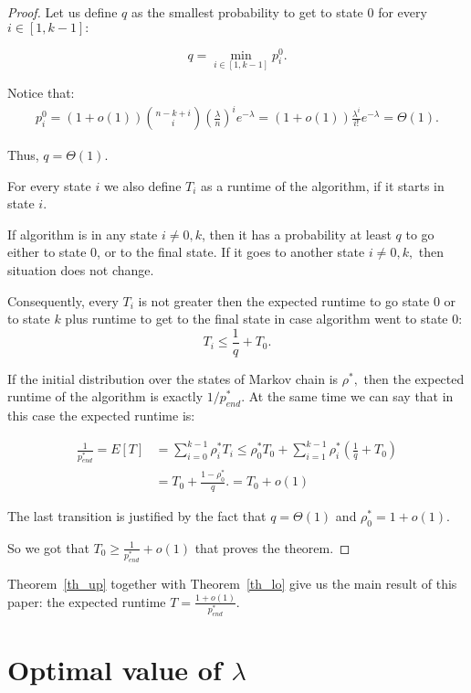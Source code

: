 \documentclass{article}
\begin{document}
\begin{proof}
Let us define $q$ as the smallest probability to get to state $0$ for every $i \in [1, k - 1]:$

$$q = \min\limits_{i \in [1, k - 1]} p_i^0.$$

Notice that:
\begin{align*}
p_i^0 = (1 + o(1))\binom{n - k + i}{i}\left(\frac{\lambda}{n}\right)^i e^{-\lambda}= (1 + o(1))\frac{\lambda^i}{i!}e^{-\lambda} = \Theta(1).
\end{align*}

Thus, $q = \Theta(1).$

For every state $i$ we also define $T_i$ as a runtime of the algorithm, if it starts in state $i$.

If algorithm is in any state $i \ne 0, k$, then it has a probability at least $q$ to go either to state $0$, or to the final state. If it goes to another state $i \ne 0, k,$ then situation does not change.

Consequently, every $T_i$ is not greater then the expected runtime to go state $0$ or to state $k$ plus runtime to get to the final state in case algorithm went to state $0:$
$$T_i \le \frac{1}{q} + T_0.$$

If the initial distribution over the states of Markov chain is $\rho^*,$ then the expected runtime of the algorithm is exactly $1/p_{end}^*.$ At the same time we can say that in this case the expected runtime is:

\begin{align*}
  \frac{1}{p_{end}^*} = E[T] &= \sum\limits_{i = 0}^{k - 1} \rho_i^* T_i \le \rho_0^* T_0 + \sum\limits_{i = 1}^{k - 1}\rho_i^*(\frac{1}{q} + T_0) \\
  &= T_0 + \frac{1 - \rho_0^*}{q}. = T_0 + o(1)
\end{align*}

The last transition is justified by the fact that $q = \Theta(1)$ and $\rho_0^* = 1 + o(1).$

So we got that $T_0 \ge \frac{1}{p_{end}^*} + o(1)$
that proves the theorem.
\end{proof}

Theorem~\ref{th_up} together with Theorem~\ref{th_lo} give us the main result of this paper: the expected runtime $T = \frac{1 + o(1)}{p_{end}^*}.$

\section{Optimal value of $\lambda$}
\end{document}
